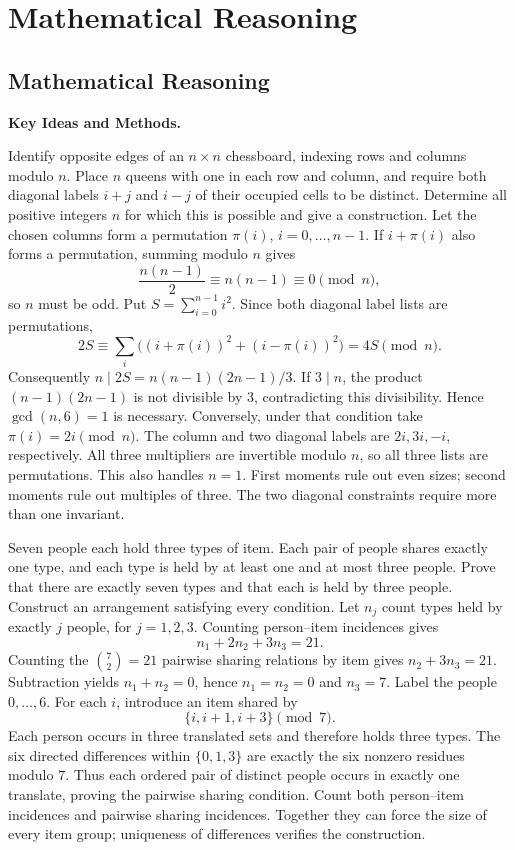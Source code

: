 \chapter{Mathematical Reasoning}

\section{Mathematical Reasoning}
\noindent\textbf{Key Ideas and Methods.}\enspace



Identify opposite edges of an $n\times n$ chessboard, indexing rows and columns modulo $n$. Place $n$ queens with one in each row and column, and require both diagonal labels $i+j$ and $i-j$ of their occupied cells to be distinct. Determine all positive integers $n$ for which this is possible and give a construction.
\solution Let the chosen columns form a permutation $\pi(i)$, $i=0,\ldots,n-1$. If $i+\pi(i)$ also forms a permutation, summing modulo $n$ gives
\[
 \frac{n(n-1)}2\equiv n(n-1)\equiv0\pmod n,
\]
so $n$ must be odd. Put $S=\sum_{i=0}^{n-1}i^2$. Since both diagonal label lists are permutations,
\[
 2S\equiv\sum_i\bigl((i+\pi(i))^2+(i-\pi(i))^2\bigr)
 =4S\pmod n.
\]
Consequently $n\mid2S=n(n-1)(2n-1)/3$. If $3\mid n$, the product $(n-1)(2n-1)$ is not divisible by $3$, contradicting this divisibility. Hence $\gcd(n,6)=1$ is necessary.
Conversely, under that condition take $\pi(i)=2i\pmod n$. The column and two diagonal labels are $2i,3i,-i$, respectively. All three multipliers are invertible modulo $n$, so all three lists are permutations. This also handles $n=1$.
\insight First moments rule out even sizes; second moments rule out multiples of three. The two diagonal constraints require more than one invariant.

Seven people each hold three types of item. Each pair of people shares exactly one type, and each type is held by at least one and at most three people. Prove that there are exactly seven types and that each is held by three people. Construct an arrangement satisfying every condition.
\solution Let $n_j$ count types held by exactly $j$ people, for $j=1,2,3$. Counting person--item incidences gives
\[
 n_1+2n_2+3n_3=21.
\]
Counting the $\binom72=21$ pairwise sharing relations by item gives $n_2+3n_3=21$. Subtraction yields $n_1+n_2=0$, hence $n_1=n_2=0$ and $n_3=7$.
Label the people $0,\ldots,6$. For each $i$, introduce an item shared by
\[
 \{i,i+1,i+3\}\pmod7.
\]
Each person occurs in three translated sets and therefore holds three types. The six directed differences within $\{0,1,3\}$ are exactly the six nonzero residues modulo $7$. Thus each ordered pair of distinct people occurs in exactly one translate, proving the pairwise sharing condition.
\insight Count both person--item incidences and pairwise sharing incidences. Together they can force the size of every item group; uniqueness of differences verifies the construction.

